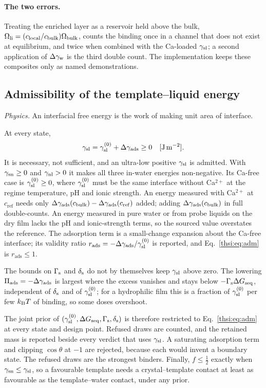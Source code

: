 \paragraph{The two errors.} Treating the enriched layer as a reservoir held above the bulk,
$\Omega_\mathrm{li}=(c_\mathrm{local}/c_\mathrm{bulk})\Omega_\mathrm{bulk}$, counts the binding once in a channel that does not exist at
equilibrium, and twice when combined with the Ca-loaded $\gamma_\mathrm{sl}$; a second application of $\Delta\gamma_\mathrm{w}$ is the third
double count. The implementation keeps these composites only as named demonstrations.

\subsection{Admissibility of the template--liquid energy}\label{thsi:sec:admissibility}

\providecommand{\Pads}{\Pi_\mathrm{ads}}
\textit{Physics.} An interfacial free energy is the work of making unit area of interface.

At every state,
\begin{equation}\label{thsi:eq:adm}
\gamma_\mathrm{sl}=\gamma_\mathrm{sl}^{(0)}+\Delta\gamma_\mathrm{ads}\ge0 \quad[\mathrm{J\,m^{-2}}].
\end{equation}
It is necessary, not sufficient, and an ultra-low positive $\gamma_\mathrm{sl}$ is admitted. With $\gamma_\mathrm{sn}\ge0$ and
$\gamma_\mathrm{nl}>0$ it makes all three in-water energies non-negative. Its Ca-free case is $\gamma_\mathrm{sl}^{(0)}\ge0$, where
$\gamma_\mathrm{sl}^{(0)}$ must be the same interface without Ca$^{2+}$ at the regime temperature, pH and ionic strength.
An energy measured with Ca$^{2+}$ at $c_\mathrm{ref}$ needs only $\Delta\gamma_\mathrm{ads}(c_\mathrm{bulk})-\Delta\gamma_\mathrm{ads}(c_\mathrm{ref})$ added;
adding $\Delta\gamma_\mathrm{ads}(c_\mathrm{bulk})$ in full double-counts. An energy measured in pure water or from probe liquids on the
dry film lacks the pH and ionic-strength terms, so the sourced value overstates the reference. The
adsorption term is a small-change expansion about the Ca-free interface; its validity ratio
$r_\mathrm{ads}=-\Delta\gamma_\mathrm{ads}/\gamma_\mathrm{sl}^{(0)}$ is reported, and Eq.~\eqref{thsi:eq:adm} is $r_\mathrm{ads}\le1$.

The bounds on $\Gamma_\mathrm{s}$ and $\delta_\mathrm{s}$ do not by themselves keep $\gamma_\mathrm{sl}$ above zero. The lowering $\Pads=-\dga$
is largest where the excess vanishes and stays below $-\Gamma_\mathrm{s}\Delta G_\mathrm{seq}$, independent of $\delta_\mathrm{s}$ and of $\gamma_\mathrm{sl}^{(0)}$;
for a hydrophilic film this is a fraction of $\gamma_\mathrm{sl}^{(0)}$ per few $k_\mathrm{B} T$ of binding, so some doses overshoot.

The joint prior of $(\gamma_\mathrm{sl}^{(0)},\Delta G_\mathrm{seq},\Gamma_\mathrm{s},\delta_\mathrm{s})$ is therefore restricted to Eq.~\eqref{thsi:eq:adm} at every
state and design point. Refused draws are counted, and the retained mass is reported beside every verdict
that uses $\gamma_\mathrm{sl}$. A saturating adsorption term and clipping $\cos\theta$ at $-1$ are rejected, because
each would invent a boundary state. The refused draws are the strongest binders. Finally, $f\le\tfrac12$
exactly when $\gamma_\mathrm{sn}\le\gamma_\mathrm{sl}$, so a favourable template needs a crystal--template contact at least as
favourable as the template--water contact, under any prior.

